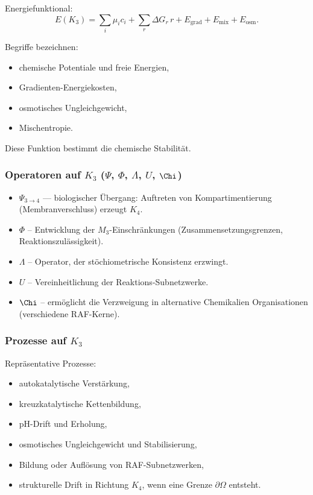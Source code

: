 Energiefunktional:
\[
E(K_3) =
\sum_i \mu_i c_i +
\sum_r \Delta G_r\, r +
E_{\mathrm{grad}} + E_{\mathrm{mix}} + E_{\mathrm{osm}}.
\]

Begriffe bezeichnen:
\begin{itemize}
    \item chemische Potentiale und freie Energien,
    \item Gradienten-Energiekosten,
    \item osmotisches Ungleichgewicht,
    \item Mischentropie.
\end{itemize}

Diese Funktion bestimmt die chemische Stabilität.

\subsubsection{Operatoren auf \texorpdfstring{$K_3$}{K_3} (\texorpdfstring{$\Psi$}{\Psi}, \texorpdfstring{$\Phi$}{\Phi}, \texorpdfstring{$\Lambda$}{\Lambda}, \texorpdfstring{$U$}{U}, \texorpdfstring{$\Chi$}{\Chi})}

\begin{itemize}
    \item $\Psi_{3\to4}$ — biologischer Übergang: Auftreten von
          Kompartimentierung (Membranverschluss) erzeugt $K_4$.
    \item $\Phi$ – Entwicklung der $M_3$-Einschränkungen (Zusammensetzungsgrenzen,
          Reaktionszulässigkeit).
    \item $\Lambda$ – Operator, der stöchiometrische Konsistenz erzwingt.
    \item $U$ – Vereinheitlichung der Reaktions-Subnetzwerke.
    \item $\Chi$ – ermöglicht die Verzweigung in alternative Chemikalien
          Organisationen (verschiedene RAF-Kerne).
\end{itemize}

\subsubsection{Prozesse auf \texorpdfstring{$K_3$}{K_3}}

Repräsentative Prozesse:
\begin{itemize}
    \item autokatalytische Verstärkung,
    \item kreuzkatalytische Kettenbildung,
    \item pH-Drift und Erholung,
    \item osmotisches Ungleichgewicht und Stabilisierung,
    \item Bildung oder Auflösung von RAF-Subnetzwerken,
    \item strukturelle Drift in Richtung $K_4$, wenn eine Grenze $\partial\Omega$
          entsteht.
\end{itemize}

